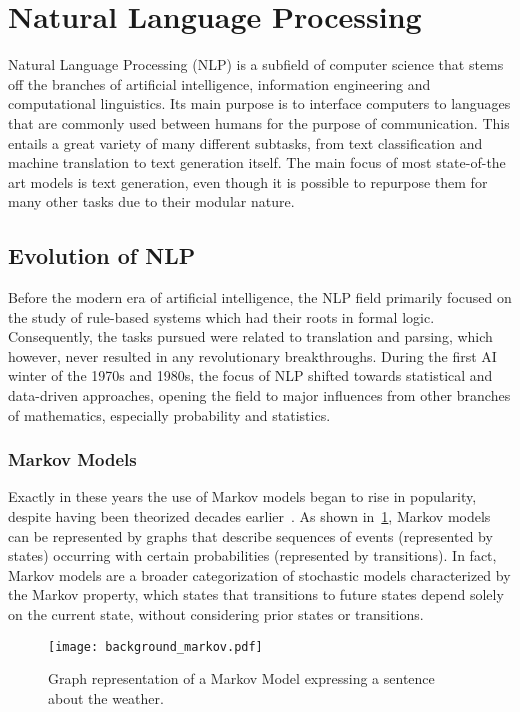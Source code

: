 \section{Natural Language Processing}

Natural Language Processing (NLP) is a subfield of computer science that stems off the branches of artificial intelligence, information engineering and computational linguistics.
Its main purpose is to interface computers to languages that are commonly used between humans for the purpose of communication.
This entails a great variety of many different subtasks, from text classification and machine translation to text generation itself.
The main focus of most state-of-the art models is text generation, even though it is possible to repurpose them for many other tasks due to their modular nature.

\subsection{Evolution of NLP}

Before the modern era of artificial intelligence, the NLP field primarily focused on the study of rule-based systems which had their roots in formal logic.
Consequently, the tasks pursued were related to translation and parsing, which however, never resulted in any revolutionary breakthroughs.
During the first AI winter of the 1970s and 1980s, the focus of NLP shifted towards statistical and data-driven approaches, opening the field to major influences from other branches of mathematics, especially probability and statistics.

\subsubsection*{Markov Models}

Exactly in these years the use of Markov models began to rise in popularity, despite having been theorized decades earlier~\cite{shannon1948}.
As shown in~\cref{fig:background_markov}, Markov models can be represented by graphs that describe sequences of events (represented by states) occurring with certain probabilities (represented by transitions). 
In fact, Markov models are a broader categorization of stochastic models characterized by the Markov property, which states that transitions to future states depend solely on the current state, without considering prior states or transitions.

\begin{figure}[t!]
    \centering
    \texttt{[image: background\_markov.pdf]}
    \caption{Graph representation of a Markov Model expressing a sentence about the weather.}
    \label{fig:background_markov}
\end{figure}

